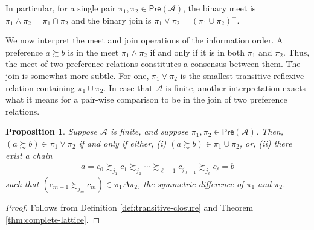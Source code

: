 \documentclass[conference]{ieeeconf}
\renewcommand{\succeq}{\succcurlyeq}
\newcommand{\A}{\mathcal{A}}
\newcommand{\Pref}{\mathsf{Pre}}
\newcommand{\prefers}{\succsim}
\newcommand{\join}{\vee}
\newcommand{\meet}{\wedge}
\newtheorem{proposition}{Proposition}
\newtheorem{remark}{Remark}
\begin{document}
In particular, for a single pair $\pi_1, \pi_2 \in \Pref(\A)$, the binary meet is $\pi_1 \meet \pi_2 = \pi_1 \cap \pi_2$ and the binary join is $\pi_1 \join \pi_2 = \left( \pi_1 \cup \pi_2 \right)^{+}$.

We now interpret the meet and join operations of the information order. A preference $a \prefers b$ is in the meet $\pi_1 \meet \pi_2$ if and only if it is in both $\pi_1$ and $\pi_2$. Thus, the meet of two preference relations constitutes a consensus between them. The join is somewhat more subtle. For one, $\pi_1 \join \pi_2$ is the smallest transitive-reflexive relation containing $\pi_1 \cup \pi_2$. In case that $\A$ is finite, another interpretation exacts what it means for a pair-wise comparison to be in the join of two preference relations.
\begin{proposition} \label{prop:join}
    Suppose $\A$ is finite, and suppose $\pi_1, \pi_2 \in \Pref(\A)$. Then, $(a \prefers b) \in \pi_1 \join \pi_2$ if and only if either, (i) $(a \prefers b) \in \pi_1 \cup \pi_2$, or, (ii) there exist a chain
    \begin{align}
        a = c_0 \prefers_{j_1} c_1 \prefers_{j_2}  \cdots \prefers_{\ell-1} c_{j_{\ell-1}} \prefers_{j_\ell} c_{\ell} = b \label{eq:chain}
    \end{align}
    such that $\left( c_{m-1} \prefers_{{j_m}} c_{m} \right) \in \pi_1 \Delta \pi_2$, the symmetric difference of $\pi_1$ and $\pi_2$.
\end{proposition}
\begin{proof}
    Follows from Definition \ref{def:transitive-closure} and Theorem \ref{thm:complete-lattice}.
\end{proof}

\end{document}
